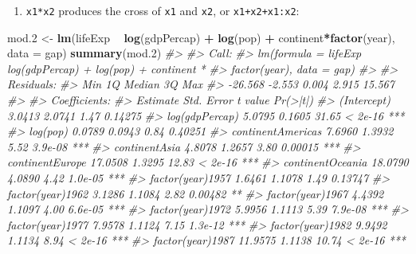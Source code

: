\documentclass[
]{book}
\newenvironment{Shaded}{\begin{snugshade}}{\end{snugshade}}
\newcommand{\CommentTok}[1]{\textcolor[rgb]{0.56,0.35,0.01}{\textit{#1}}}
\newcommand{\DataTypeTok}[1]{\textcolor[rgb]{0.13,0.29,0.53}{#1}}
\newcommand{\FloatTok}[1]{\textcolor[rgb]{0.00,0.00,0.81}{#1}}
\newcommand{\KeywordTok}[1]{\textcolor[rgb]{0.13,0.29,0.53}{\textbf{#1}}}
\newcommand{\NormalTok}[1]{#1}
\newcommand{\OperatorTok}[1]{\textcolor[rgb]{0.81,0.36,0.00}{\textbf{#1}}}
\newcommand{\StringTok}[1]{\textcolor[rgb]{0.31,0.60,0.02}{#1}}
\providecommand{\tightlist}{%
  \setlength{\itemsep}{0pt}\setlength{\parskip}{0pt}}
\begin{document}
\begin{enumerate}
\def\labelenumi{\arabic{enumi}.}
\setcounter{enumi}{1}
\tightlist
\item
  \texttt{x1*x2} produces the cross of \texttt{x1} and \texttt{x2}, or \texttt{x1+x2+x1:x2}:
\end{enumerate}

\begin{Shaded}
\begin{Highlighting}[]
\NormalTok{mod}\FloatTok{.2}\NormalTok{ <-}\StringTok{ }\KeywordTok{lm}\NormalTok{(lifeExp }\OperatorTok{~}\StringTok{ }\KeywordTok{log}\NormalTok{(gdpPercap) }\OperatorTok{+}\StringTok{ }\KeywordTok{log}\NormalTok{(pop) }\OperatorTok{+}\StringTok{ }\NormalTok{continent}\OperatorTok{*}\KeywordTok{factor}\NormalTok{(year), }\DataTypeTok{data =}\NormalTok{ gap)}
\KeywordTok{summary}\NormalTok{(mod}\FloatTok{.2}\NormalTok{)}
\CommentTok{#> }
\CommentTok{#> Call:}
\CommentTok{#> lm(formula = lifeExp ~ log(gdpPercap) + log(pop) + continent * }
\CommentTok{#>     factor(year), data = gap)}
\CommentTok{#> }
\CommentTok{#> Residuals:}
\CommentTok{#>     Min      1Q  Median      3Q     Max }
\CommentTok{#> -26.568  -2.553   0.004   2.915  15.567 }
\CommentTok{#> }
\CommentTok{#> Coefficients:}
\CommentTok{#>                                    Estimate Std. Error t value Pr(>|t|)    }
\CommentTok{#> (Intercept)                          3.0413     2.0741    1.47  0.14275    }
\CommentTok{#> log(gdpPercap)                       5.0795     0.1605   31.65  < 2e-16 ***}
\CommentTok{#> log(pop)                             0.0789     0.0943    0.84  0.40251    }
\CommentTok{#> continentAmericas                    7.6960     1.3932    5.52  3.9e-08 ***}
\CommentTok{#> continentAsia                        4.8078     1.2657    3.80  0.00015 ***}
\CommentTok{#> continentEurope                     17.0508     1.3295   12.83  < 2e-16 ***}
\CommentTok{#> continentOceania                    18.0790     4.0890    4.42  1.0e-05 ***}
\CommentTok{#> factor(year)1957                     1.6461     1.1078    1.49  0.13747    }
\CommentTok{#> factor(year)1962                     3.1286     1.1084    2.82  0.00482 ** }
\CommentTok{#> factor(year)1967                     4.4392     1.1097    4.00  6.6e-05 ***}
\CommentTok{#> factor(year)1972                     5.9956     1.1113    5.39  7.9e-08 ***}
\CommentTok{#> factor(year)1977                     7.9578     1.1124    7.15  1.3e-12 ***}
\CommentTok{#> factor(year)1982                     9.9492     1.1134    8.94  < 2e-16 ***}
\CommentTok{#> factor(year)1987                    11.9575     1.1138   10.74  < 2e-16 ***}

\end{Highlighting}
\end{Shaded}
\end{document}
